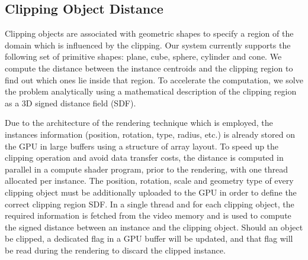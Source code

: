 \subsection{Clipping Object Distance}
\label{localization}
Clipping objects are associated with geometric shapes to specify a region of the domain which is influenced by the clipping.
Our system currently supports the following set of primitive shapes: plane, cube, sphere, cylinder and cone.
We compute the distance between the instance centroids and the clipping region to find out which ones lie inside that region.
To accelerate the computation, we solve the problem analytically using a mathematical description of the clipping region as a 3D signed distance field (SDF).

Due to the architecture of the rendering technique which is employed, the instances information (position, rotation, type, radius, etc.) is already stored on the GPU in large buffers using a structure of array layout.
To speed up the clipping operation and avoid data transfer costs, the distance is computed in parallel in a compute shader program, prior to the rendering, with one thread allocated per instance.  
The position, rotation, scale and geometry type of every clipping object must be additionally uploaded to the GPU in order to define the correct clipping region SDF.
In a single thread and for each clipping object, the required information is fetched from the video memory and is used to compute the signed distance between an instance and the clipping object.
Should an object be clipped, a dedicated flag in a GPU buffer will be updated, and that flag will be read during the rendering to discard the clipped instance.

